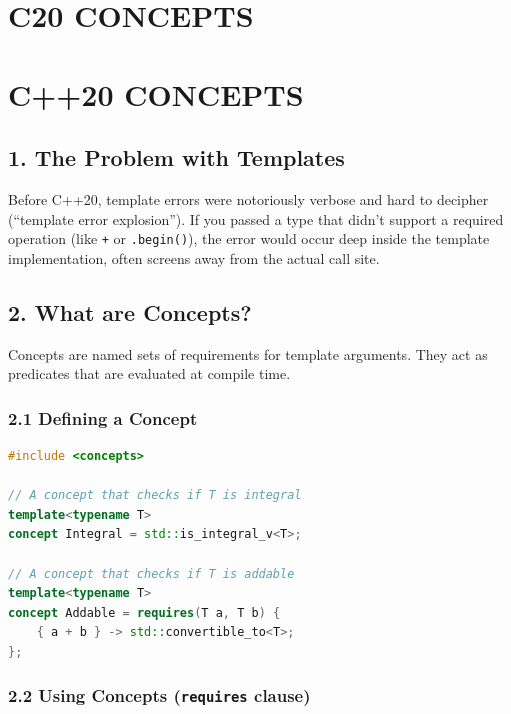 \hypertarget{c20-concepts}{%
\chapter{C20 CONCEPTS}\label{c20-concepts}}

\hypertarget{c20-concepts-1}{%
\chapter{C++20 CONCEPTS}\label{c20-concepts-1}}

\hypertarget{the-problem-with-templates}{%
\section{1. The Problem with
Templates}\label{the-problem-with-templates}}

Before C++20, template errors were notoriously verbose and hard to
decipher (``template error explosion''). If you passed a type that
didn't support a required operation (like \passthrough{\lstinline!+!} or
\passthrough{\lstinline!.begin()!}), the error would occur deep inside
the template implementation, often screens away from the actual call
site.

\hypertarget{what-are-concepts}{%
\section{2. What are Concepts?}\label{what-are-concepts}}

Concepts are named sets of requirements for template arguments. They act
as predicates that are evaluated at compile time.

\hypertarget{defining-a-concept}{%
\subsection{2.1 Defining a Concept}\label{defining-a-concept}}

\begin{lstlisting}[language={C++}]
#include <concepts>

// A concept that checks if T is integral
template<typename T>
concept Integral = std::is_integral_v<T>;

// A concept that checks if T is addable
template<typename T>
concept Addable = requires(T a, T b) {
    { a + b } -> std::convertible_to<T>;
};
\end{lstlisting}

\hypertarget{using-concepts-requires-clause}{%
\subsection{\texorpdfstring{2.2 Using Concepts (\texttt{requires}
clause)}{2.2 Using Concepts (requires clause)}}\label{using-concepts-requires-clause}}

